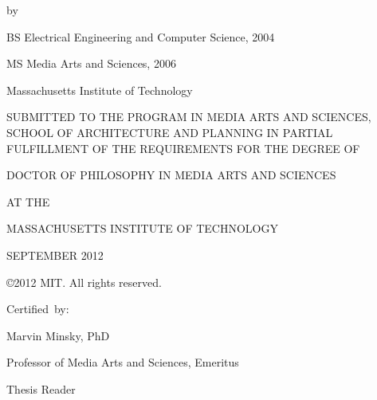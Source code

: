 \thispagestyle{empty}

\cleardoublepage

\begin{addmargin}[1cm]{-2cm}
\begin{center}
    \begingroup
        \color{Maroon}\spacedallcaps{\myTitle}
    \endgroup

    \vspace{2mm}

    by

    \vspace{2mm}

    \myName

    \vspace{6mm}
    
    BS Electrical Engineering and Computer Science, 2004
    
    MS Media Arts and Sciences, 2006

    Massachusetts Institute of Technology
    
    \vspace{6mm}

 SUBMITTED TO THE PROGRAM IN MEDIA ARTS AND SCIENCES, SCHOOL OF
 ARCHITECTURE AND PLANNING IN PARTIAL FULFILLMENT OF THE REQUIREMENTS
 FOR THE DEGREE OF

    \vspace{6mm}

DOCTOR OF PHILOSOPHY IN MEDIA ARTS AND SCIENCES

AT THE

MASSACHUSETTS INSTITUTE OF TECHNOLOGY

    \vspace{6mm}

SEPTEMBER 2012

    \vspace{6mm}

\copyright 2012 MIT.  All rights reserved.

\end{center}        


\begin{flushright}
  \vspace{15mm}

  Certified~by:\hspace{0.5cm}~\makebox[2.75in]{\hrulefill}
  
Marvin Minsky, PhD

Professor of Media Arts and Sciences, Emeritus

Thesis Reader

\end{flushright}

\end{addmargin}
